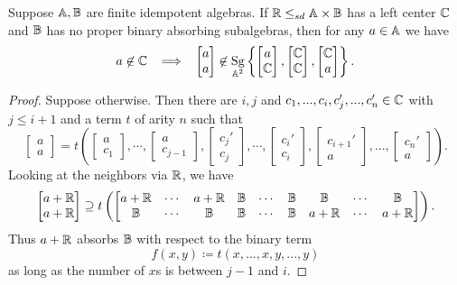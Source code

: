 \documentclass[letterpaper,11pt]{article}
\DeclareMathOperator{\Sg}{Sg}
\begin{document}
\begin{thm} Suppose $\mathbb{A}, \mathbb{B}$ are finite idempotent algebras. If $\mathbb{R} \le_{sd} \mathbb{A} \times \mathbb{B}$ has a left center $\mathbb{C}$ and $\mathbb{B}$ has no proper binary absorbing subalgebras, then for any $a \in \mathbb{A}$ we have
\[
a \not\in \bC \;\; \implies \;\; \begin{bmatrix}a\\ a\end{bmatrix} \not\in \Sg_{\bA^2}\left\{\begin{bmatrix}a\\ \bC\end{bmatrix}, \begin{bmatrix}\bC\\ \bC\end{bmatrix}, \begin{bmatrix}\bC\\ a\end{bmatrix}\right\}.
\]
\end{thm}
\begin{proof} Suppose otherwise. Then there are $i,j$ and $c_1, ..., c_i, c_j', ..., c_n' \in \mathbb{C}$ with $j \le i+1$ and a term $t$ of arity $n$ such that
\[
\begin{bmatrix}a\\ a\end{bmatrix} = t\left(\begin{bmatrix}a\\ c_1\end{bmatrix}, \cdots, \begin{bmatrix}a\\ c_{j-1}\end{bmatrix}, \begin{bmatrix}c_j'\\ c_j\end{bmatrix}, \cdots, \begin{bmatrix}c_i'\\ c_i\end{bmatrix}, \begin{bmatrix}c_{i+1}'\\ a\end{bmatrix}, ..., \begin{bmatrix}c_n'\\ a\end{bmatrix}\right).
\]
Looking at the neighbors via $\mathbb{R}$, we have
\[
\begin{bmatrix}a+\mathbb{R}\\ a+\mathbb{R}\end{bmatrix} \supseteq t\left(\begin{bmatrix} a+\mathbb{R} & \cdots & a+\mathbb{R} & \mathbb{B} & \cdots & \mathbb{B} & \mathbb{B} & \cdots & \mathbb{B}\\ \mathbb{B} & \cdots & \mathbb{B} & \mathbb{B} & \cdots & \mathbb{B} & a+\mathbb{R} & \cdots & a+\mathbb{R} \end{bmatrix}\right).
\]
Thus $a+\mathbb{R}$ absorbs $\mathbb{B}$ with respect to the binary term
\[
f(x,y) \coloneqq t(x,...,x,y,...,y)
\]
as long as the number of $x$s is between $j-1$ and $i$.
\end{proof}
\end{document}
